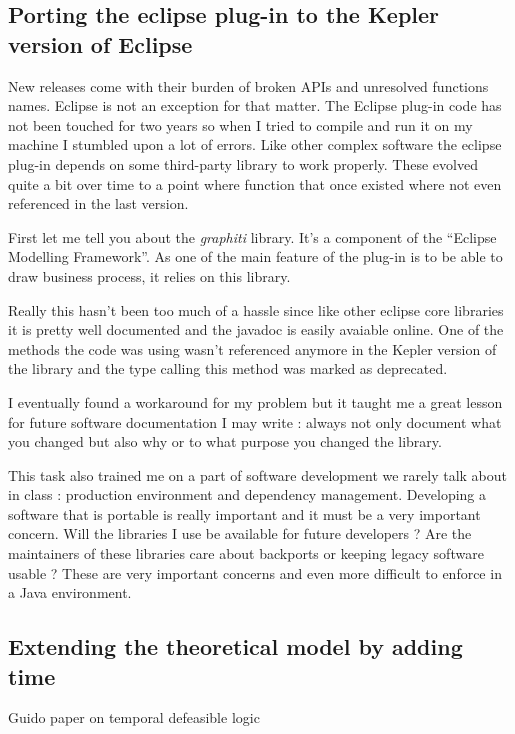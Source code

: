 \documentclass[10pt]{report}
\begin{document}
\subsection{Porting the eclipse plug-in to the Kepler version of Eclipse}

New releases come with their burden of broken APIs and unresolved functions names. Eclipse is not an exception for that matter. The Eclipse plug-in code has not been touched for two years so when I tried to compile and run it on my machine I stumbled upon a lot of errors. Like other complex software the eclipse plug-in depends on some third-party library to work properly. These evolved quite a bit over time to a point where function that once existed where not even referenced in the last version.

First let me tell you about the \textit{graphiti} library. It's a component of the \enquote{Eclipse Modelling Framework}. As one of the main feature of the plug-in is to be able to draw business process, it relies on this library.

Really this hasn't been too much of a hassle since like other eclipse core libraries it is pretty well documented and the javadoc is easily avaiable online. One of the methods the code was using wasn't referenced anymore in the Kepler version of the library and the type calling this method was marked as deprecated. 

I eventually found a workaround for my problem but it taught me a great lesson for future software documentation I may write : always not only document what you changed but also why or to what purpose you changed the library.

This task also trained me on a part of software development we rarely talk about in class : production environment and dependency management. Developing a software that is portable is really important and it must be a very important concern. Will the libraries I use be available for future developers ? Are the maintainers of these libraries care about backports or keeping legacy software usable ?
These are very important concerns and even more difficult to enforce in a Java environment. %


\subsection{Extending the theoretical model by adding time}
Guido paper on temporal defeasible logic \autocite{JusticeDelayed2011} \autocite{TemporalExtension2007}
\end{document}
